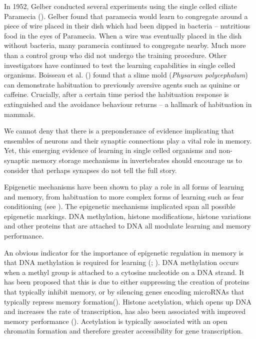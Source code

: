 \documentclass[
  jou,
  floatsintext,
  longtable,
  nolmodern,
  notxfonts,
  notimes,
  donotrepeattitle,
  colorlinks=true,linkcolor=blue,citecolor=blue,urlcolor=blue]{apa7}
\begin{document}
In 1952, Gelber conducted several experiments using the single celled
ciliate Paramecia (). Gelber found that paramecia would learn to congregate around a
piece of wire placed in their dish which had been dipped in bacteria --
nutritious food in the eyes of Paramecia. When a wire was eventually
placed in the dish without bacteria, many paramecia continued to
congregate nearby. Much more than a control group who did not undergo
the training procedure. Other investigators have continued to test the
learning capabilities in single celled organisms. Boisseau et al.
() found that a slime mold
(\emph{Physarum polycephalum}) can demonstrate habituation to previously
aversive agents such as quinine or caffeine. Crucially, after a certain
time period the habituation response is extinguished and the avoidance
behaviour returns -- a hallmark of habituation in mammals.~

We cannot deny that there is a preponderance of evidence implicating
that ensembles of neurons and their synaptic connections play a vital
role in memory. Yet, this emerging evidence of learning in single celled
organisms and non-synaptic memory storage mechanisms in invertebrates
should encourage us to consider that perhaps synapses do not tell the
full story.

Epigenetic mechanisms have been shown to play a role in all forms of
learning and memory, from habituation to more complex forms of learning
such as fear conditioning (see
). The
epigenetic mechanisms implicated span all possible epigenetic markings.
DNA methylation, histone modifications, histone variations and other
proteins that are attached to DNA all modulate learning and memory
performance.

An obvious indicator for the importance of epigenetic regulation in
memory is that DNA methylation is required for learning
(;
). DNA
methylation occurs when a methyl group is attached to a cytosine
nucleotide on a DNA strand. It has been proposed that this is due to
either suppressing the creation of proteins that typically inhibit
memory, or by silencing genes encoding microRNAs that typically repress
memory formation(). Histone acetylation, which opens up DNA and increases the
rate of transcription, has also been associated with improved memory
performance (). Acetylation is typically associated with an open chromatin
formation and therefore greater accessibility for gene transcription.
\end{document}
